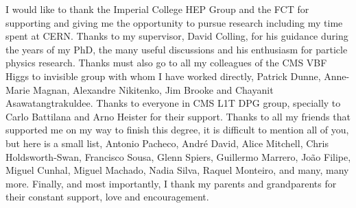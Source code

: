 \begin{acknowledgements}
I would like to thank the Imperial College HEP Group and the FCT for supporting and giving me the opportunity to pursue research including my time spent at CERN. Thanks to my supervisor, David Colling, for his guidance during the years of my PhD, the many useful discussions and his enthusiasm for particle physics research. Thanks must also go to all my colleagues of the CMS VBF Higgs to invisible group with whom I have worked directly, Patrick Dunne, Anne-Marie Magnan, Alexandre Nikitenko, Jim Brooke and Chayanit Asawatangtrakuldee. Thanks to everyone in CMS L1T DPG group, specially to Carlo Battilana and Arno Heister for their support. Thanks to all my friends that supported me on my way to finish this degree, it is difficult to mention all of you, but here is a small list, Antonio Pacheco, André David, Alice Mitchell, Chris Holdsworth-Swan, Francisco Sousa, Glenn Spiers, Guillermo Marrero, João Filipe, Miguel Cunhal, Miguel Machado, Nadia Silva, Raquel Monteiro, and many, many more. Finally, and most importantly, I thank my parents and grandparents for their constant support, love and encouragement.
\end{acknowledgements}




\dedication{To my grandmother.}


\tableofcontents

\newpage
\listoftables

\newpage
\listoffigures


 
